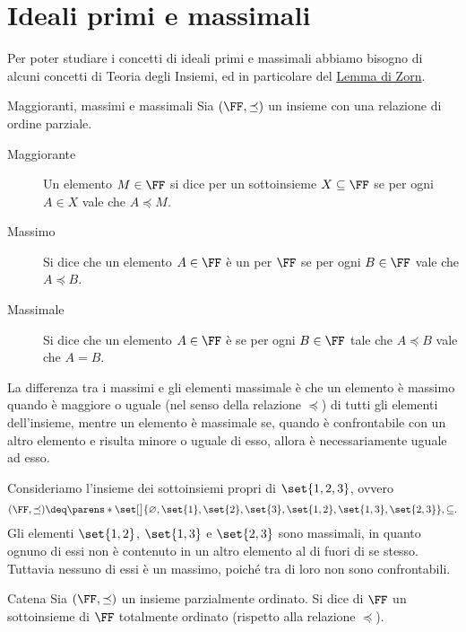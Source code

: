 \section{Ideali primi e massimali}

Per poter studiare i concetti di ideali primi e massimali abbiamo bisogno di alcuni concetti di Teoria degli Insiemi, ed in particolare del \hyperref[lem:Zorn]{Lemma di Zorn}.

\begin{definition}{Maggioranti, massimi e massimali}{}
    Sia $(\FF, \preceq)$ un insieme con una relazione di ordine parziale.
    \begin{description}
        \item[Maggiorante] Un elemento $M \in \FF$ si dice  per un sottoinsieme $X \subseteq \FF$ se per ogni $A \in X$ vale che $A \preceq M$.
        \item[Massimo] Si dice che un elemento $A \in \FF$ è un  per $\FF$ se per ogni $B \in \FF$ vale che $A \preceq B$.
        \item[Massimale] Si dice che un elemento $A \in \FF$ è  se per ogni $B \in \FF$ tale che $A \preceq B$ vale che $A = B$.
    \end{description}
\end{definition}

\begin{remark}
    La differenza tra i massimi e gli elementi massimale è che un elemento è massimo quando è maggiore o uguale (nel senso della relazione $\preceq$) di tutti gli elementi dell'insieme, mentre un elemento è massimale se, quando è confrontabile con un altro elemento e risulta minore o uguale di esso, allora è necessariamente uguale ad esso.
\end{remark}
\begin{example}
    Consideriamo l'insieme dei sottoinsiemi propri di $\set{1, 2, 3}$, ovvero \[
        (\FF, \preceq) \deq \parens*{\set[\big]{\varnothing, \set{1}, \set{2}, \set{3}, \set{1, 2},\set{1, 3}, \set{2, 3}}, \subseteq}.
    \] Gli elementi $\set{1, 2}$, $\set{1, 3}$ e $\set{2, 3}$ sono massimali, in quanto ognuno di essi non è contenuto in un altro elemento al di fuori di se stesso. Tuttavia nessuno di essi è un massimo, poiché tra di loro non sono confrontabili.
\end{example}

\begin{definition}
    {Catena}{}
    Sia $(\FF, \preceq)$ un insieme parzialmente ordinato. Si dice  di $\FF$ un sottoinsieme di $\FF$ totalmente ordinato (rispetto alla relazione $\preceq$).
\end{definition}


